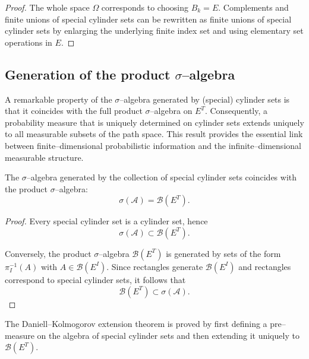 \begin{proof}
The whole space $\Omega$ corresponds to choosing $B_k = E$.
Complements and finite unions of special cylinder sets can be rewritten as finite unions
of special cylinder sets by enlarging the underlying finite index set and using
elementary set operations in $E$.
\end{proof}

\subsection*{Generation of the product $\sigma$--algebra}
A remarkable property of the $\sigma$--algebra generated by (special) cylinder
sets is that it coincides with the full product $\sigma$--algebra on $E^T$. Consequently, a
probability measure that is uniquely determined on cylinder sets extends uniquely to all
measurable subsets of the path space. This result provides the essential link between
finite--dimensional probabilistic information and the infinite--dimensional measurable
structure.
\begin{lemma}
The $\sigma$--algebra generated by the collection of special cylinder sets coincides with
the product $\sigma$--algebra:
\[
\sigma(\mathcal{A}) = \mathcal{B}(E^T).
\]
\end{lemma}

\begin{proof}
Every special cylinder set is a cylinder set, hence
\[
\sigma(\mathcal{A}) \subset \mathcal{B}(E^T).
\]

Conversely, the product $\sigma$--algebra $\mathcal{B}(E^T)$ is generated by sets of the
form $\pi_I^{-1}(A)$ with $A \in \mathcal{B}(E^I)$.
Since rectangles generate $\mathcal{B}(E^I)$ and rectangles correspond to special
cylinder sets, it follows that
\[
\mathcal{B}(E^T) \subset \sigma(\mathcal{A}).
\]
\end{proof}

\begin{remark}
The Daniell--Kolmogorov extension theorem is proved by first defining a pre--measure
on the algebra of special cylinder sets and then extending it uniquely to
$\mathcal{B}(E^T)$.
\end{remark}

